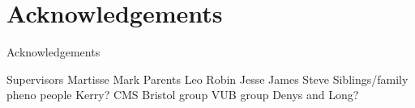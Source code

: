 \chapter*{Acknowledgements} 

Acknowledgements

Supervisors
Martisse
Mark
Parents
Leo
Robin
Jesse
James
Steve
Siblings/family
pheno people
Kerry?
CMS
Bristol group
VUB group
Denys and Long?
